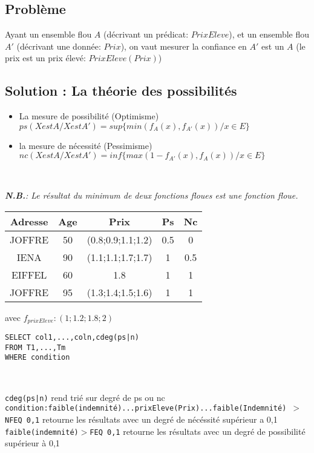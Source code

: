 \documentclass[a4paper,11pt]{article}
\begin{document}
\subsection{Problème}

Ayant un ensemble flou $ A $ (décrivant un prédicat: $PrixEleve$), et un ensemble flou $ A' $   (décrivant une donnée: $Prix$), on vaut mesurer la confiance en  $ A' $ est un $ A $ (le prix est un prix élevé: $PrixEleve(Prix)$)

\subsection{Solution : La théorie des possibilités}
\begin{itemize}
\item La mesure de possibilité (Optimisme)\\
$ ps(X est A / Xest A')=sup\{min(f_A(x),f_{A'}(x)) / x \in E\} $
\item la mesure de nécessité (Pessimisme)\\
$ nc(X est A / X est A')=inf \{max(1-f_{A'}(x), f_A(x)) / x \in E\} $
\end{itemize}
~

\emph{\textbf{N.B.}: Le résultat du minimum de deux fonctions floues est une fonction floue.}

\begin{center}
\begin{tabular}{|c|c|c|c|c|}
	\hline 
	\textbf{Adresse} & \textbf{Age} & \textbf{Prix} & \textbf{Ps} & \textbf{Nc} \\ 
	\hline
	\hline 
	JOFFRE & 50 & (0.8;0.9;1.1;1.2) & 0.5 & 0 \\ 
	\hline 
	IENA & 90 & (1.1;1.1;1.7;1.7) & 1 & 0.5  \\ 
	\hline 
	EIFFEL & 60 & 1.8 & 1 & 1  \\ 
	\hline 
	JOFFRE & 95 & (1.3;1.4;1.5;1.6) & 1 & 1  \\ 
	\hline 
\end{tabular} 
\end{center}
avec $f_{prixEleve}:(1;1.2;1.8;2)$

\begin{lstlisting}[mathescape]
SELECT col1,...,coln,cdeg(ps|n)
FROM T1,...,Tm
WHERE condition
\end{lstlisting}
~

\noindent \texttt{cdeg(ps|n)} rend trié sur degré de ps ou nc\\
\texttt{condition:faible(indemnité)...prixEleve(Prix)...faible(Indemnité) $>$ NFEQ 0,1} retourne les résultats avec un degré de nécéssité supérieur a 0,1\\
\texttt{faible(indemnité)$>$FEQ 0,1} retourne les résultats avec un degré de possibilité supérieur à 0,1
\end{document}

